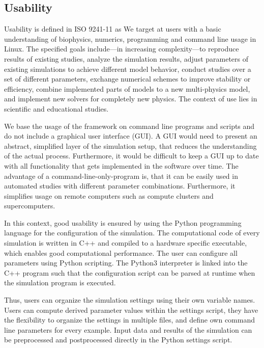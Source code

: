 \subsection{Usability}
Usability is defined in ISO 9241-11 \cite{ISO9241} as   
We target at users with a basic understanding of biophysics, numerics, programming and command line usage in Linux. 
The specified goals include---in increasing complexity---to reproduce results of existing studies,  analyze the simulation results,  adjust parameters of existing simulations to achieve different model behavior, conduct studies over a set of different parameters,  exchange numerical schemes to improve stability or efficiency, combine implemented parts of models to a new multi-physics model, and implement new solvers for completely new physics. The context of use lies in scientific and educational studies. 

We base the usage of the framework on command line programs and scripts and do not include a graphical user interface (GUI). A GUI would need to present an abstract, simplified layer of the simulation setup, that reduces the understanding of the actual process. Furthermore, it would be difficult to keep a GUI up to date with all functionality that gets implemented in the software over time. The advantage of a command-line-only-program is, that it can be easily used in automated studies with different parameter combinations. Furthermore, it simplifies usage on remote computers such as compute clusters and supercomputers.

In this context, good usability is ensured by using the Python programming language for the configuration of the simulation.
The computational code of every simulation is written in C++ and compiled to a hardware specific executable, which enables good computational performance. The user can configure all parameters using Python scripting. The Python3 interpreter is linked into the C++ program such that the configuration script can be parsed at runtime when the simulation program is executed.

Thus, users can organize the simulation settings using their own variable names.
Users can compute derived parameter values within the settings script, they have the flexibility to organize the settings in multiple files, and define own command line parameters for every example. Input data and results of the simulation can be preprocessed and postprocessed directly in the Python settings script.

